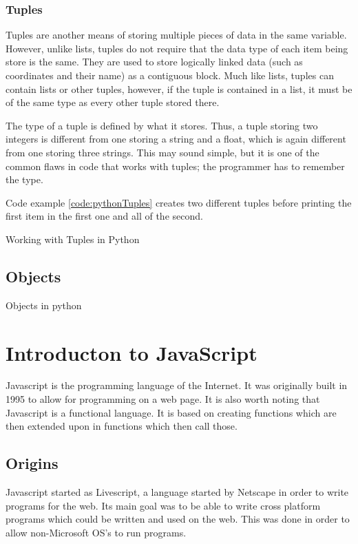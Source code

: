 			\subsubsection{Tuples}
				Tuples are another means of storing multiple pieces of data in the same variable. 
				However, unlike lists, tuples do not require that the data type of each item being store is the same. 
				They are used to store logically linked data (such as coordinates and their name) as a contiguous block.
				Much like lists, tuples can contain lists or other tuples, however, if the tuple is contained in a list, 
				it must be of the same type as every other tuple stored there. 

				The type of a tuple is defined by what it stores. 
				Thus, a tuple storing two integers is different from one storing a string and a float, which is again different from one storing three strings. 
				This may sound simple, but it is one of the common flaws in code that works with tuples; the programmer has to remember the type. 

				Code example \ref{code:pythonTuples} creates two different tuples before printing the first item in the first one and all of the second. 
				\begin{code}
					\centering
					
					\caption{Working with Tuples in Python}
					\label{code:pythonTuples}
				\end{code}
		\subsection{Objects}
			Objects in python 
	\section{Introducton to JavaScript}
		Javascript is the programming language of the Internet. 
		It was originally built in 1995 to allow for programming on a web page. 
		It is also worth noting that Javascript is a functional language\cite{JSProgrammingLanguage}.
		It is based on creating functions which are then extended upon in functions which then call those. 

		\subsection{Origins}
		 
			Javascript started as Livescript, a language started by Netscape in order to write programs for the web. 
			Its main goal was to be able to write cross platform programs which could be written and used on the web. 
			This was done in order to allow non-Microsoft OS's to run programs. 

